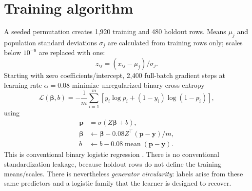 \section{Training algorithm}
A seeded permutation creates 1,920 training and 480 holdout rows. Means $\mu_j$ and population standard deviations $\sigma_j$ are calculated from training rows only; scales below $10^{-9}$ are replaced with one:
\begin{equation}z_{ij}=(x_{ij}-\mu_j)/\sigma_j.\end{equation}
Starting with zero coefficients/intercept, 2,400 full-batch gradient steps at learning rate $\alpha=0.08$ minimize unregularized binary cross-entropy
\begin{equation}
\mathcal L(\boldsymbol\beta,b)=-\frac1m\sum_{i=1}^m[y_i\log p_i+(1-y_i)\log(1-p_i)],
\end{equation}
using
\begin{align}
\mathbf p&=\sigma(Z\boldsymbol\beta+b),\\
\boldsymbol\beta&\leftarrow\boldsymbol\beta-0.08Z^\top(\mathbf p-\mathbf y)/m,\\
b&\leftarrow b-0.08\operatorname{mean}(\mathbf p-\mathbf y).
\end{align}
This is conventional binary logistic regression \citep{bishop2006pattern}. There is no conventional standardization leakage, because holdout rows do not define the training means/scales. There is nevertheless \emph{generator circularity}: labels arise from these same predictors and a logistic family that the learner is designed to recover.

